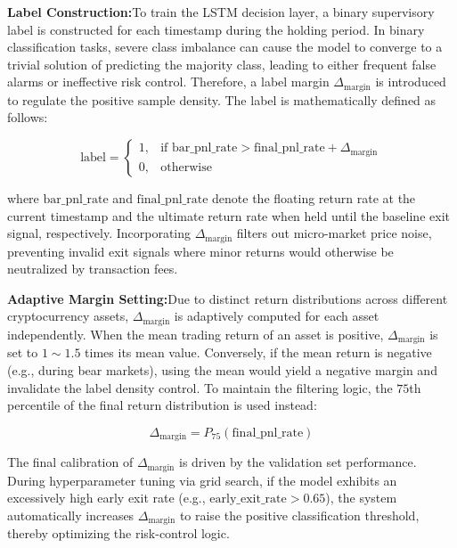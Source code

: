 \documentclass[12pt]{article}
\begin{document}
\textbf{Label Construction:}To train the LSTM decision layer, a binary supervisory label is constructed for each 
timestamp during the holding period. In binary classification tasks, severe class 
imbalance can cause the model to converge to a trivial solution of predicting the 
majority class, leading to either frequent false alarms or ineffective risk control. 
Therefore, a label margin $\Delta_{\text{margin}}$ is introduced to regulate the 
positive sample density. The label is mathematically defined as follows:

\begin{equation}
\text{label} = \begin{cases} 
1, & \text{if } \text{bar\_pnl\_rate} > \text{final\_pnl\_rate} + \Delta_{\text{margin}} \\ 
0, & \text{otherwise} 
\end{cases}
\end{equation}

where $\text{bar\_pnl\_rate}$ and $\text{final\_pnl\_rate}$ denote the floating return rate 
at the current timestamp and the ultimate return rate when held until the baseline exit 
signal, respectively. Incorporating $\Delta_{\text{margin}}$ filters out micro-market price 
noise, preventing invalid exit signals where minor returns would otherwise be neutralized 
by transaction fees.

\textbf{Adaptive Margin Setting:}Due to distinct return distributions across different cryptocurrency assets, 
$\Delta_{\text{margin}}$ is adaptively computed for each asset independently. When the mean 
trading return of an asset is positive, $\Delta_{\text{margin}}$ is set to $1 \sim 1.5$ 
times its mean value. Conversely, if the mean return is negative (e.g., during bear markets), 
using the mean would yield a negative margin and invalidate the label density control. To 
maintain the filtering logic, the $75$th percentile of the final return distribution is used 
instead:

\begin{equation}
\Delta_{\text{margin}} = P_{75}(\text{final\_pnl\_rate})
\end{equation}

The final calibration of $\Delta_{\text{margin}}$ is driven by the validation set 
performance. During hyperparameter tuning via grid search, if the model exhibits an 
excessively high early exit rate (e.g., $\text{early\_exit\_rate} > 0.65$), the system 
automatically increases $\Delta_{\text{margin}}$ to raise the positive classification 
threshold, thereby optimizing the risk-control logic.
\end{document}
